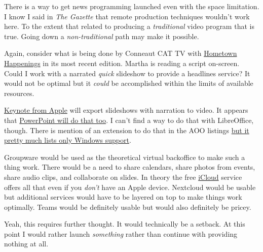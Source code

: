 There is a way to get news programming launched even with the space
limitation. I know I said in \emph{The Gazette} that remote production
techniques wouldn't work here. To the extent that related to producing a
\emph{traditional} video program that is true. Going down a
\emph{non-traditional} path may make it possible.

Again, consider what is being done by Conneaut CAT TV with
\href{https://vimeo.com/799131311}{Hometown Happenings} in its most
recent edition. Martha is reading a script on-screen. Could I work with
a narrated \emph{quick} slideshow to provide a headlines service? It
would not be optimal but it \emph{could} be accomplished within the
limits of available resources.

\href{https://support.apple.com/guide/keynote/record-presentations-tan81813d552/mac}{Keynote
from Apple} will export slideshows with narration to video. It appears
that
\href{https://support.microsoft.com/en-us/office/turn-your-presentation-into-a-video-c140551f-cb37-4818-b5d4-3e30815c3e83}{PowerPoint
will do that too}. I can't find a way to do that with LibreOffice,
though. There is mention of an extension to do that in the AOO listings
\href{https://extensions.openoffice.org/en/project/impress-video-converter}{but
it pretty much lists only Windows support}.

Groupware would be used as the theoretical virtual backoffice to make
such a thing work. There would be a need to share calendars, share
photos from events, share audio clips, and collaborate on slides. In
theory the free \href{https://en.wikipedia.org/wiki/ICloud}{iCloud}
service offers all that even if you \emph{don't} have an Apple device.
Nextcloud would be usable but additional services would have to be
layered on top to make things work optimally. Teams would be definitely
usable but would also definitely be pricey.

Yeah, this requires further thought. It would technically be a setback.
At this point I would rather launch \emph{something} rather than
continue with providing nothing at all.
